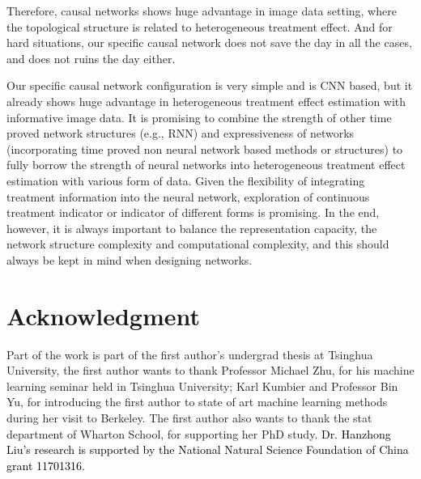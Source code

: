 \documentclass[11pt,paper=letter]{scrartcl}
\newcommand\hz[1]{\textcolor{black}{#1}}
\begin{document}
Therefore, causal networks shows huge advantage in image data setting, where the topological structure is related to heterogeneous treatment effect. And for hard situations, our specific causal network does not save the day in all the cases, and does not ruins the day either.

Our specific causal network configuration is very simple and is CNN based, but it already shows huge advantage in heterogeneous treatment effect estimation with informative image data. It is promising to combine the strength of other time proved network structures (e.g., RNN) and expressiveness of networks (incorporating time proved non neural network based methods or structures) to fully borrow the strength of neural networks into heterogeneous treatment effect estimation with various form of data. Given the flexibility of integrating treatment information into the neural network, exploration of continuous treatment indicator or indicator of different forms is promising. In the end, however, it is always important to balance the representation capacity, the network structure complexity and computational complexity, and this should always be kept in mind when designing networks.




\section{ Acknowledgment}
Part of the work is part of the first author's undergrad thesis at Tsinghua University, the first author wants to thank Professor Michael Zhu, for his machine learning seminar held in Tsinghua University; Karl Kumbier and Professor Bin Yu, for introducing the first author to state of art machine learning methods during her visit to Berkeley. The first author also wants to thank the stat department of Wharton School, for supporting her PhD study. \hz{Dr. Hanzhong Liu's research is supported by the National Natural Science Foundation of China grant 11701316.}
\end{document}

